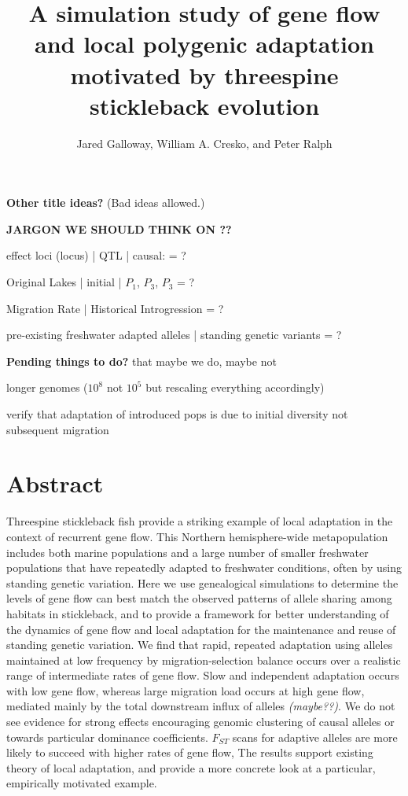 \documentclass{article}
\begin{document}
\title{A simulation study of gene flow and local polygenic adaptation motivated by threespine stickleback evolution}
\author{Jared Galloway, William A. Cresko, and Peter Ralph}
\maketitle

\textbf{Other title ideas?} (Bad ideas allowed.)


\textbf{JARGON WE SHOULD THINK ON ??}

effect loci (locus) | QTL | causal: = ?
 
Original Lakes | initial | $P_{1}$, $P_{3}$, $P_{3}$ = ?

Migration Rate | Historical Introgression = ?

pre-existing freshwater adapted alleles | standing genetic variants = ?


\textbf{Pending things to do?} that maybe we do, maybe not

longer genomes ($10^8$ not $10^5$ but rescaling everything accordingly)

verify that adaptation of introduced pops is due to initial diversity not subsequent migration

\section{Abstract}

Threespine stickleback fish provide a striking example of local adaptation in the context of recurrent gene flow. This Northern hemisphere-wide metapopulation includes both marine populations and a large number of smaller freshwater populations that have repeatedly adapted to freshwater conditions, often by using standing genetic variation. Here we use genealogical simulations to determine the levels of gene flow can best match the observed patterns of allele sharing among habitats in stickleback, and to provide a framework for better understanding of the dynamics of gene flow and local adaptation for the maintenance and reuse of standing genetic variation. We find that rapid, repeated adaptation using alleles maintained at low frequency by migration-selection balance occurs over a realistic range of intermediate rates of gene flow.  Slow and independent adaptation occurs with low gene flow, whereas large migration load occurs at high gene flow, mediated mainly by the total downstream influx of alleles \emph{(maybe??)}. We do not see evidence for strong effects encouraging genomic clustering of causal alleles or towards particular dominance coefficients. $F_{ST}$ scans for adaptive alleles are more likely to succeed with higher rates of gene flow, The results support existing theory of local adaptation, and provide a more concrete look at a particular, empirically motivated example.  
\end{document}
